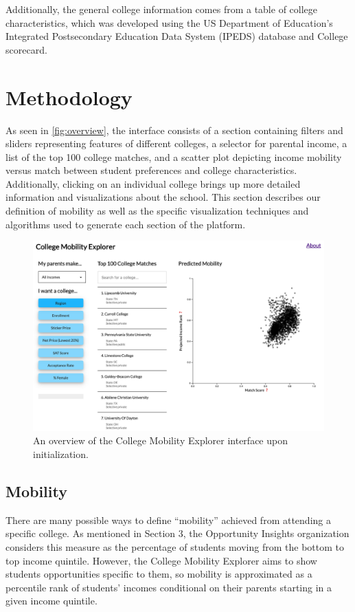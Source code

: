 \documentclass{vgtc}
\begin{document}
Additionally, the general college information comes from a table of college characteristics, which was developed using the US Department of Education's Integrated Postsecondary Education Data System (IPEDS) database and College scorecard.

\section{Methodology}
As seen in \autoref{fig:overview}, the interface consists of a section containing filters and sliders representing features of different colleges, a selector for parental income, a list of the top 100 college matches, and a scatter plot depicting income mobility versus match between student preferences and college characteristics. Additionally, clicking on an individual college brings up more detailed information and visualizations about the school. This section describes our definition of mobility as well as the specific visualization techniques and algorithms used to generate each section of the platform.

\begin{figure}[tbh]
 \centering
 \includegraphics[width=\columnwidth]{overview.png}
 \caption{An overview of the College Mobility Explorer interface upon initialization.}
 \label{fig:overview}
\end{figure}

\subsection{Mobility}
There are many possible ways to define ``mobility'' achieved from attending a specific college. As mentioned in Section 3, the Opportunity Insights organization considers this measure as the percentage of students moving from the bottom to top income quintile. However, the College Mobility Explorer aims to show students opportunities specific to them, so mobility is approximated as a percentile rank of students' incomes conditional on their parents starting in a given income quintile.
\end{document}
